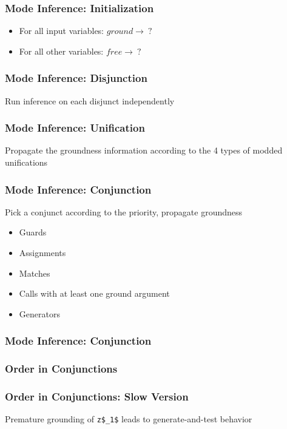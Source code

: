 \documentclass[xcolor=table]{beamer}
\begin{document}
\begin{frame}[fragile]
  \frametitle{Mode Inference: Initialization }

\begin{itemize}
  \item For all input variables: $ground \rightarrow \ ?$
  \item For all other variables: $free \rightarrow \ ?$
\end{itemize}


\end{frame}

\begin{frame}[fragile]
  \frametitle{Mode Inference: Disjunction }
Run inference on each disjunct independently



\end{frame}


\begin{frame}[fragile]
  \frametitle{Mode Inference: Unification}
Propagate the groundness information according to the 4 types of modded unifications




\end{frame}

\begin{frame}[fragile]
  \frametitle{Mode Inference: Conjunction}
Pick a conjunct according to the priority, propagate groundness
\begin{itemize}
  \item Guards
  \item Assignments
  \item Matches
  \item Calls with at least one ground argument
  \item Generators
\end{itemize}
\end{frame}

\begin{frame}[fragile]
  \frametitle{Mode Inference: Conjunction}



\end{frame}

\begin{frame}[fragile]
  \frametitle{Order in Conjunctions}
  
\end{frame}

\begin{frame}[fragile]
  \frametitle{Order in Conjunctions: Slow Version}
  

  Premature grounding of \lstinline{z$_1$} leads to generate-and-test behavior
\end{frame}
\end{document}
